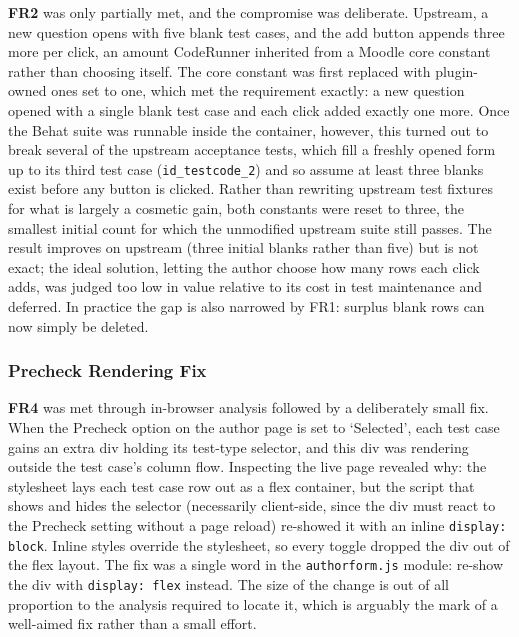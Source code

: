 \textbf{FR2} was only partially met, and the compromise was deliberate. Upstream, a new question opens with five blank test cases, and the add button appends three more per click, an amount CodeRunner inherited from a Moodle core constant rather than choosing itself. The core constant was first replaced with plugin-owned ones set to one, which met the requirement exactly: a new question opened with a single blank test case and each click added exactly one more. Once the Behat suite was runnable inside the container, however, this turned out to break several of the upstream acceptance tests, which fill a freshly opened form up to its third test case (\texttt{id\_testcode\_2}) and so assume at least three blanks exist before any button is clicked. Rather than rewriting upstream test fixtures for what is largely a cosmetic gain, both constants were reset to three, the smallest initial count for which the unmodified upstream suite still passes. The result improves on upstream (three initial blanks rather than five) but is not exact; the ideal solution, letting the author choose how many rows each click adds, was judged too low in value relative to its cost in test maintenance and deferred. In practice the gap is also narrowed by FR1: surplus blank rows can now simply be deleted.

\subsubsection{Precheck Rendering Fix}
\textbf{FR4} was met through in-browser analysis followed by a deliberately small fix. When the Precheck option on the author page is set to `Selected', each test case gains an extra div holding its test-type selector, and this div was rendering outside the test case's column flow. Inspecting the live page revealed why: the stylesheet lays each test case row out as a flex container, but the script that shows and hides the selector (necessarily client-side, since the div must react to the Precheck setting without a page reload) re-showed it with an inline \texttt{display: block}. Inline styles override the stylesheet, so every toggle dropped the div out of the flex layout. The fix was a single word in the \texttt{authorform.js} module: re-show the div with \texttt{display: flex} instead. The size of the change is out of all proportion to the analysis required to locate it, which is arguably the mark of a well-aimed fix rather than a small effort.

